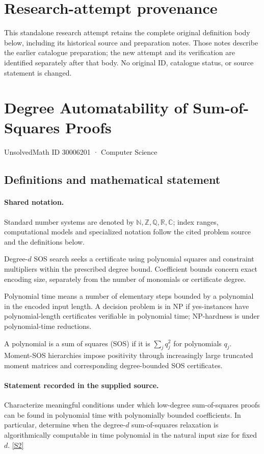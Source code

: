 \documentclass[11pt]{article}
\begin{document}
\section*{Research-attempt provenance}
This standalone research attempt retains the complete original definition body below,
including its historical source and preparation notes. Those notes describe the
earlier catalogue preparation; the new attempt and its verification are identified
separately after that body. No original ID, catalogue status, or source statement is changed.

\section{Degree Automatability of Sum-of-Squares Proofs}\label{30006201}
{\small UnsolvedMath ID 30006201 · Computer Science}
\subsection{Definitions and mathematical statement}

\paragraph{Shared notation.}Standard number systems are denoted by $\mathbb N,\mathbb Z,\mathbb Q,\mathbb R,\mathbb C$; index ranges, computational models and specialized notation follow the cited problem source and the definitions below.


Degree-$d$ SOS search seeks a certificate using polynomial squares and constraint multipliers within the prescribed degree bound. Coefficient bounds concern exact encoding size, separately from the number of monomials or certificate degree.

Polynomial time means a number of elementary steps bounded by a polynomial in the encoded input length. A decision problem is in $\mathrm{NP}$ if yes-instances have polynomial-length certificates verifiable in polynomial time; NP-hardness is under polynomial-time reductions.

A polynomial is a sum of squares (SOS) if it is $\sum_j q_j^2$ for polynomials $q_j$. Moment-SOS hierarchies impose positivity through increasingly large truncated moment matrices and corresponding degree-bounded SOS certificates.
\paragraph{Statement recorded in the supplied source.}
Characterize meaningful conditions under which low-degree sum-of-squares proofs can be found in polynomial time with polynomially bounded coefficients. In particular, determine when the degree-$d$ sum-of-squares relaxation is algorithmically computable in time polynomial in the natural input size for fixed $d$. \href{https://doi.org/10.4171/owr/2025/9}{[S2]}
\end{document}
